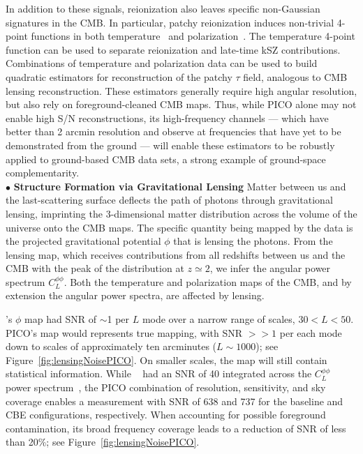 \documentclass[PICOReport.tex]{subfiles}
\begin{document}
In addition to these signals, reionization also leaves specific non-Gaussian signatures in the CMB.  In particular, patchy reionization induces non-trivial 4-point functions in both temperature~\citep{SmithFerraro2017} and polarization~\citep{DvorkinSmith2008}.  The temperature 4-point function can be used to separate reionization and late-time kSZ contributions.  Combinations of temperature and polarization data can be used to build quadratic estimators for reconstruction of the patchy $\tau$ field, analogous to CMB lensing reconstruction.  These estimators generally require high angular resolution, but also rely on foreground-cleaned CMB maps.  Thus, while PICO alone may not enable high S/N reconstructions, its high-frequency channels --- which have better than 2 arcmin resolution and observe at frequencies that have yet to be demonstrated from the ground --- will enable these estimators to be robustly applied to ground-based CMB data sets, a strong example of ground-space complementarity. \\ %
%
 $\bullet$ {\bf Structure Formation via Gravitational Lensing} \hspace{0.1in} \label{gravitationallensing}
Matter between us and the last-scattering surface deflects the path of photons through gravitational lensing, imprinting the 3-dimensional matter distribution across the volume of the universe onto the CMB maps. The specific quantity being mapped by the data is the projected gravitational potential $\phi$ that is lensing the photons. From the lensing map, which
receives contributions from all redshifts between us and the CMB with the peak of the distribution at $z \simeq 2$, we infer the angular power spectrum $C_{L}^{\phi \phi}$. %
Both the temperature and polarization maps of the CMB, and by extension the angular power spectra, are affected by lensing. 

\planck 's $\phi$ map had \ac{SNR} of $\sim$1 per $L$ mode over a narrow range of scales, $30 < L < 50$. PICO's map would represents true mapping, with \ac{SNR} $>>1$ per each mode down to scales of approximately ten arcminutes ($L \sim 1000$); see Figure~\ref{fig:lensingNoisePICO}.  On smaller scales, the map will still contain statistical information. While \planck~  had an \ac{SNR} of 40 integrated across the $C_{L}^{\phi \phi}$ power spectrum~\citep{2018arXiv180706210P}, the PICO combination of resolution, sensitivity, and sky coverage enables a measurement with SNR of 638 and 737 for the baseline and CBE configurations, respectively.  When accounting for possible foreground contamination, its broad frequency coverage leads to a reduction of SNR of less than 20\%; see Figure~\ref{fig:lensingNoisePICO}.  
\end{document}
